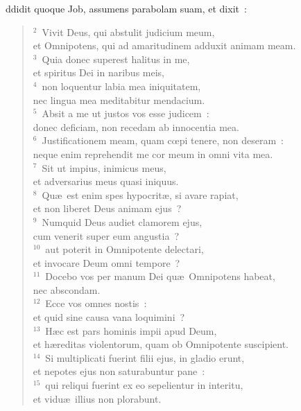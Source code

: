 \bchapter
{}ddidit quoque Job, assumens parabolam suam, et dixit~:
\begin{flushleft}\begin{verse}\vspace{6pt}${}^{2}$~Vivit Deus, qui abstulit judicium meum,\\ et Omnipotens, qui ad amaritudinem adduxit animam meam.\\
${}^{3}$~Quia donec superest halitus in me,\\ et spiritus Dei in naribus meis,\\
${}^{4}$~non loquentur labia mea iniquitatem,\\ nec lingua mea meditabitur mendacium.\\
${}^{5}$~Absit a me ut justos vos esse judicem~:\\ donec deficiam, non recedam ab innocentia mea.\\
${}^{6}$~Justificationem meam, quam cœpi tenere, non deseram~:\\ neque enim reprehendit me cor meum in omni vita mea.\\
${}^{7}$~Sit ut impius, inimicus meus,\\ et adversarius meus quasi iniquus.\\
${}^{8}$~Qu\ae\ est enim spes hypocrit\ae , si avare rapiat,\\ et non liberet Deus animam ejus~?\\
${}^{9}$~Numquid Deus audiet clamorem ejus,\\ cum venerit super eum angustia~?\\
${}^{10}$~aut poterit in Omnipotente delectari,\\ et invocare Deum omni tempore~?\\
${}^{11}$~Docebo vos per manum Dei qu\ae\ Omnipotens habeat,\\ nec abscondam.\\
${}^{12}$~Ecce vos omnes nostis~:\\ et quid sine causa vana loquimini~?\\
${}^{13}$~H\ae c est pars hominis impii apud Deum,\\ et h\ae reditas violentorum, quam ob Omnipotente suscipient.\\
${}^{14}$~Si multiplicati fuerint filii ejus, in gladio erunt,\\ et nepotes ejus non saturabuntur pane~:\\
${}^{15}$~qui reliqui fuerint ex eo sepelientur in interitu,\\ et vidu\ae\ illius non plorabunt.\\

\end{verse}
\end{flushleft}
